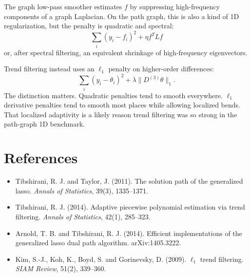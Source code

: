 \documentclass[11pt]{article}
\begin{document}
The graph low-pass smoother estimates \(f\) by suppressing high-frequency
components of a graph Laplacian. On the path graph, this is also a kind of 1D
regularization, but the penalty is quadratic and spectral:
\[
\sum_i (y_i-f_i)^2 + \eta f^T L f
\]
or, after spectral filtering, an equivalent shrinkage of high-frequency
eigenvectors.

Trend filtering instead uses an \(\ell_1\) penalty on higher-order differences:
\[
\sum_i (y_i-\theta_i)^2 + \lambda \|D^{(3)}\theta\|_1.
\]
The distinction matters. Quadratic penalties tend to smooth everywhere.
\(\ell_1\) derivative penalties tend to smooth most places while allowing
localized bends. That localized adaptivity is a likely reason trend filtering
was so strong in the path-graph 1D benchmark.

\section{References}

\begin{itemize}
  \item Tibshirani, R. J. and Taylor, J. (2011). The solution path of the
  generalized lasso. \emph{Annals of Statistics}, 39(3), 1335--1371.
  \item Tibshirani, R. J. (2014). Adaptive piecewise polynomial estimation via
  trend filtering. \emph{Annals of Statistics}, 42(1), 285--323.
  \item Arnold, T. B. and Tibshirani, R. J. (2014). Efficient implementations
  of the generalized lasso dual path algorithm. arXiv:1405.3222.
  \item Kim, S.-J., Koh, K., Boyd, S. and Gorinevsky, D. (2009). \(\ell_1\)
  trend filtering. \emph{SIAM Review}, 51(2), 339--360.
\end{itemize}
\end{document}
